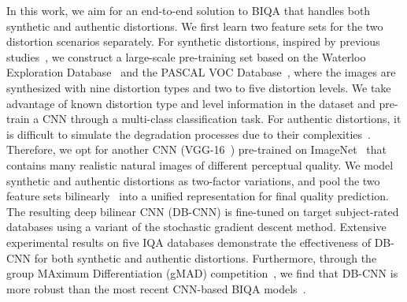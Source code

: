\documentclass[journal]{IEEEtran}
\begin{document}


In this work, we aim for an end-to-end solution to BIQA that handles both synthetic and authentic distortions. We first learn two feature sets for the two distortion scenarios separately. For synthetic distortions, inspired by previous studies~\cite{Kang2015Simultaneous,Ma2018End}, we construct a large-scale pre-training set based on the Waterloo Exploration Database~\cite{ma2017waterloo} and the PASCAL VOC Database~\cite{everingham2010pascal}, where the images are synthesized with nine distortion types and two to five distortion levels. We take advantage of known distortion type and level information in the dataset and pre-train a CNN through a multi-class classification task. For authentic distortions, it is difficult to simulate the degradation processes due to their complexities~\cite{ghadiyaram2017perceptual}. Therefore, we opt for another CNN (VGG-16~\cite{simonyan2014very}) pre-trained on ImageNet~\cite{deng2009imagenet} that contains many realistic natural images of different perceptual quality.   We model synthetic and authentic distortions as two-factor variations, and pool the two feature sets bilinearly~\cite{lin2015bilinear} into a unified representation for final quality prediction. The resulting deep bilinear CNN (DB-CNN) is fine-tuned on target subject-rated databases using a variant of the stochastic gradient descent method. Extensive experimental results on five  IQA databases demonstrate the effectiveness of DB-CNN for both synthetic and authentic distortions. Furthermore, through the group MAximum Differentiation (gMAD) competition~\cite{ma2016group}, we find that DB-CNN is more robust than the most recent CNN-based BIQA models~\cite{bosse2016deep,Ma2018End}.
\end{document}
